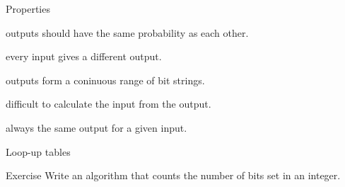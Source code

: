 \begin{frame}{Properties}
  \begin{description}
    \setlength\itemsep{6mm}
    \item[Uniform:] outputs should have the same probability as each other.
    \item[Prefect:] every input gives a different output.
    \item[Minimal:] outputs form a coninuous range of bit strings.
    \item[Cryptographic:] difficult to calculate the input from the output.
    \item[Deterministic:] always the same output for a given input.
  \end{description}
\end{frame}

\begin{frame}{Loop-up tables}
  \begin{exampleblock}{Exercise}
    Write an algorithm that counts the number of bits set in an integer.
  \end{exampleblock}
\end{frame}